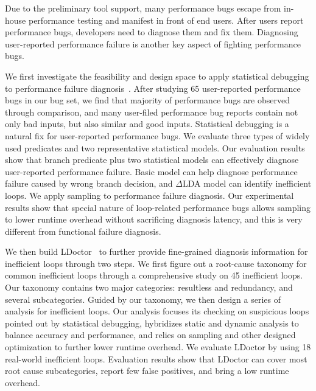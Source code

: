 \documentclass[10pt]{article}
\begin{document}
Due to the preliminary tool support, many performance bugs escape from in-house performance testing and manifest in front of end users. 
After users report performance bugs, developers need to diagnose them and fix them.
Diagnosing user-reported performance failure is another key aspect of fighting performance bugs. 

We first investigate the feasibility and design space to apply statistical debugging to performance failure diagnosis~\cite{Song14OOPSLA}.
After studying 65 user-reported performance bugs in our bug set, 
we find that majority of performance bugs are observed through comparison, 
and many user-filed performance bug reports contain not only bad inputs, but also similar and good inputs.
Statistical debugging is a natural fix for user-reported performance bugs. 
We evaluate three types of widely used predicates and two representative statistical models. 
Our evaluation results show that branch predicate plus two statistical models can effectively diagnose user-reported performance failure. 
Basic model can help diagnose performance failure caused by wrong branch decision, and $\Delta $LDA model can identify inefficient loops.  
We apply sampling to performance failure diagnosis. Our experimental results show that
special nature of loop-related performance bugs allows sampling to lower runtime overhead without sacrificing diagnosis latency, 
and this is very different from functional failure diagnosis.

We then build LDoctor~\cite{Song16PLDI} to further provide fine-grained diagnosis information for inefficient loops through two steps. 
We first figure out a root-cause taxonomy for common inefficient loops through a comprehensive study on 45 inefficient loops. 
Our taxonomy contains two major categories: resultless and redundancy, and several subcategories. 
Guided by our taxonomy, we then design a series of analysis for inefficient loops. 
Our analysis 
focuses its checking on suspicious loops pointed out by statistical debugging, 
hybridizes static and dynamic analysis to balance accuracy and performance, 
and relies on sampling and other designed optimization to further lower runtime overhead. 
We evaluate LDoctor by using 18 real-world inefficient loops. 
Evaluation results show that LDoctor can cover most root cause subcategories, 
report few false positives, and bring a low runtime overhead. 
\end{document}
